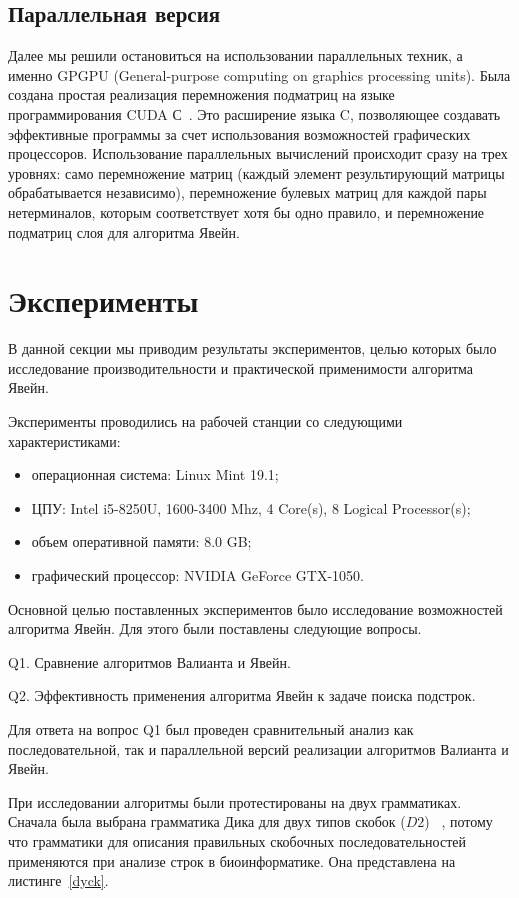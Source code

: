 \subsection{Параллельная версия}

Далее мы решили остановиться на использовании параллельных техник, а именно GPGPU (General-purpose computing on graphics processing units). Была создана простая реализация перемножения подматриц на языке программирования CUDA С~\cite{nvidia2011nvidia}. Это расширение языка C, позволяющее создавать эффективные программы за счет использования возможностей графических процессоров.  Использование параллельных вычислений происходит сразу на трех уровнях: само перемножение матриц (каждый элемент результирующий матрицы обрабатывается независимо), перемножение булевых матриц для каждой пары нетерминалов, которым соответствует хотя бы одно правило, и перемножение подматриц слоя для алгоритма Явейн.


\section{Эксперименты}

В данной секции мы приводим результаты экспериментов, целью которых было исследование производительности и практической применимости алгоритма Явейн.

Эксперименты проводились на рабочей станции со следующими характеристиками:
\begin{itemize}
    \item операционная система: Linux Mint 19.1;
    \item ЦПУ: Intel i5-8250U, 1600-3400 Mhz, 4 Core(s), 8 Logical Processor(s);
    \item объем оперативной памяти: 8.0 GB;
    \item графический процессор: NVIDIA GeForce GTX-1050.
\end{itemize}

Основной целью поставленных экспериментов было исследование возможностей алгоритма Явейн.
Для этого были поставлены следующие вопросы.

Q1. Сравнение алгоритмов Валианта и Явейн.

Q2. Эффективность применения алгоритма Явейн к задаче поиска подстрок.

Для ответа на вопрос Q1 был проведен сравнительный анализ как последовательной, так и параллельной версий реализации алгоритмов Валианта и Явейн.

При исследовании алгоритмы были протестированы на двух грамматиках. Сначала была выбрана грамматика Дика для двух типов скобок ($D2$) ~\cite{hopcroft1969formal}, потому что грамматики для описания правильных скобочных последовательностей применяются при анализе строк в биоинформатике. Она представлена на листинге~\ref{dyck}.

